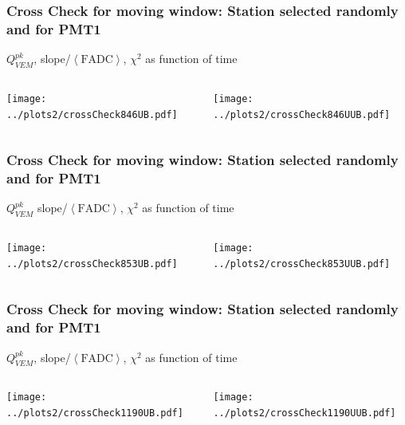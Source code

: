 \documentclass[aspectratio=169]{beamer}
\begin{document}
\begin{frame}
  \frametitle{Cross Check for moving window: Station selected
  randomly and for PMT1}
  $Q^{pk}_{VEM}$, slope/$\left<\mathrm{FADC}\right>$, $\chi^2$ as
  function of time
  \vspace{0.5cm}
  \begin{columns}
    \begin{column}{0.5\textwidth}
      \texttt{[image: ../plots2/crossCheck846UB.pdf]}
    \end{column}
    \begin{column}{0.5\textwidth}
      \texttt{[image: ../plots2/crossCheck846UUB.pdf]}
    \end{column}
  \end{columns}
\end{frame}

\begin{frame}
  \frametitle{Cross Check for moving window: Station selected
  randomly and for PMT1}
  $Q^{pk}_{VEM}$ slope/$\left<\mathrm{FADC}\right>$, $\chi^2$ as
  function of time
  \vspace{0.5cm}
  \begin{columns}
    \begin{column}{0.5\textwidth}
      \texttt{[image: ../plots2/crossCheck853UB.pdf]}
    \end{column}
    \begin{column}{0.5\textwidth}
      \texttt{[image: ../plots2/crossCheck853UUB.pdf]}
    \end{column}
  \end{columns}
\end{frame}

\begin{frame}
  \frametitle{Cross Check for moving window: Station selected
  randomly and for PMT1}
  $Q^{pk}_{VEM}$, slope/$\left<\mathrm{FADC}\right>$, $\chi^2$ as
  function of time
  \vspace{0.5cm}
  \begin{columns}
    \begin{column}{0.5\textwidth}
      \texttt{[image: ../plots2/crossCheck1190UB.pdf]}
    \end{column}
    \begin{column}{0.5\textwidth}
      \texttt{[image: ../plots2/crossCheck1190UUB.pdf]}
    \end{column}
  \end{columns}
\end{frame}
\end{document}
